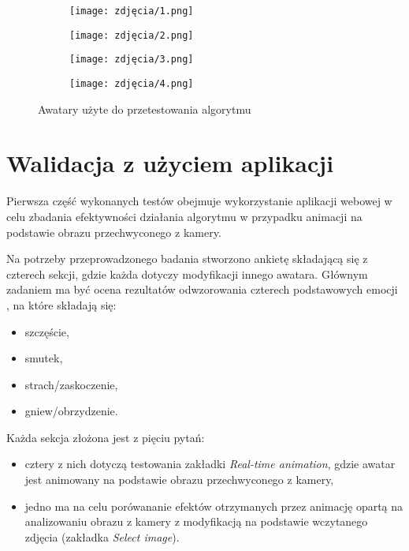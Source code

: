 \begin{figure}[h]
	\centering
	\begin{subfigure}{0.35\textwidth}
		\centering
		\texttt{[image: zdjęcia/1.png]}
		\subcaption{\label{avatar_1}}
	\end{subfigure}
	\begin{subfigure}{0.35\textwidth}
		\centering
		\texttt{[image: zdjęcia/2.png]}
		\subcaption{\label{avatar_2}}
	\end{subfigure}
	\begin{subfigure}{0.35\textwidth}
		\centering
		\texttt{[image: zdjęcia/3.png]}
		\subcaption{\label{avatar_3}}
	\end{subfigure}
	\begin{subfigure}{0.35\textwidth}
		\centering
		\texttt{[image: zdjęcia/4.png]}
		\subcaption{\label{avatar_4}}
	\end{subfigure}
	
	\caption{\label{fig:avatars}Awatary użyte do przetestowania algorytmu}
\end{figure}


\section{Walidacja z użyciem aplikacji}
Pierwsza część wykonanych testów obejmuje wykorzystanie aplikacji webowej w celu zbadania efektywności działania algorytmu w przypadku animacji na podstawie obrazu przechwyconego z kamery. 

Na potrzeby przeprowadzonego badania stworzono ankietę składającą się z czterech sekcji, gdzie każda dotyczy modyfikacji innego awatara. Głównym zadaniem ma być ocena rezultatów odwzorowania czterech podstawowych emocji \cite{emotions}, na które składają się:

\begin{itemize}
    \item szczęście,
    \item smutek,
    \item strach/zaskoczenie,
    \item gniew/obrzydzenie.
\end{itemize}

Każda sekcja złożona jest z pięciu pytań:
\begin{itemize}
    \item cztery z nich dotyczą testowania zakładki \textit{Real-time animation}, gdzie awatar jest animowany na podstawie obrazu przechwyconego z kamery,
    \item jedno ma na celu porówananie efektów otrzymanych przez animację opartą na analizowaniu obrazu z kamery z modyfikacją na podstawie wczytanego zdjęcia (zakładka \textit{Select image}).
\end{itemize}

